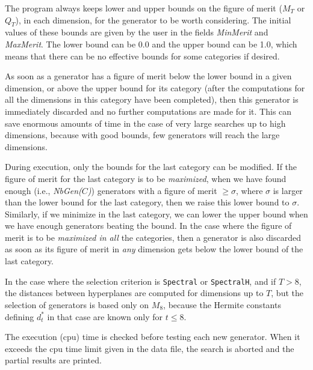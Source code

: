 The program always keeps lower and upper bounds
on the figure of merit ($M_T$ or $Q_T$), in each dimension,
for the generator to be worth considering.  
The initial values of these bounds are given by the user
in the fields {\em MinMerit} and {\em MaxMerit}.
The lower bound can be 0.0 and the upper bound can be 1.0, 
which means that there can be no effective bounds for some
categories if desired.

As soon as a generator has a figure of merit below the lower
bound in a given dimension, or above the upper bound for its
category (after the computations for all the dimensions in this
category have been completed), then this generator is immediately
discarded and no further computations are made for it.
This can save enormous amounts of time in the case of very large
searches up to high dimensions, because with good bounds,
few generators will reach the large dimensions.

During execution, only the bounds for the last category can be
modified.  If the figure of merit for the last category is to be
{\em maximized\/}, when we have found enough (i.e., {\em NbGen($C$)})
generators with a figure of merit $\ge \sigma$, where $\sigma$
is larger than the lower bound for the last category, then we raise
this lower bound to $\sigma$.
Similarly, if we minimize in the last category, we can lower 
the upper bound when we have enough generators beating the bound.
In the case where the figure of merit is to be {\em maximized in 
all\/} the categories, then a generator is also discarded
as soon as its figure of merit in {\em any\/} dimension gets below 
the lower bound of the last category.

In the case where the selection criterion is {\tt Spectral} or
{\tt SpectralH}, and if $T>8$, the distances between
hyperplanes are computed for dimensions up to $T$, but the selection of
generators is based only on $M_{8}$, because the Hermite constants
defining $d_t^*$ in that case are known only for $t\le 8$.

The execution (cpu) time is checked before testing each new generator.
When it exceeds the cpu time limit given in the data file,
the search is aborted and the partial results are printed.

